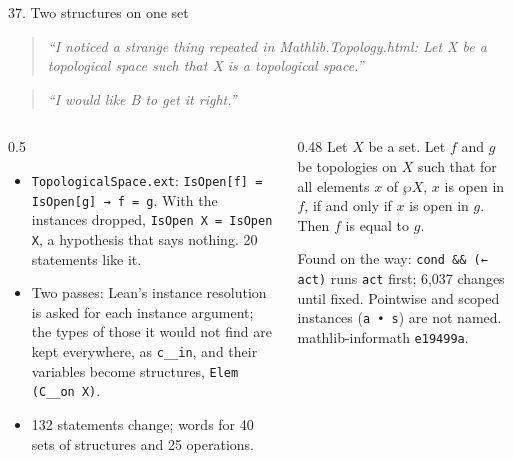 \documentclass[10pt,aspectratio=169]{beamer}
\newcommand{\bad}[1]{\textcolor{warn}{#1}}
\newcommand{\ok}[1]{\textcolor{good}{#1}}
\newcommand{\commit}[1]{\texttt{\footnotesize #1}}
\newcommand{\prompt}[1]{\begin{quote}\small\itshape ``#1''\end{quote}}
\begin{document}
\begin{frame}[fragile]{37. Two structures on one set}
  \footnotesize
  \prompt{I noticed a strange thing repeated in Mathlib.Topology.html: Let X be a topological
  space such that X is a topological space.}
  \prompt{I would like B to get it right.}
  \begin{columns}[T]
    \begin{column}{0.5\textwidth}
      \begin{itemize}
        \item \texttt{TopologicalSpace.ext}: \texttt{IsOpen[f] = IsOpen[g] → f = g}. With the
              instances dropped, \bad{\texttt{IsOpen X = IsOpen X}}, a hypothesis that says
              nothing. 20 statements like it.
        \item Two passes: Lean's instance resolution is asked for each instance argument; the
              types of those it would not find are kept everywhere, as \texttt{c\_\_in}, and
              their variables become structures, \texttt{Elem (C\_\_on X)}.
        \item 132 statements change; words for 40 sets of structures and 25 operations.
      \end{itemize}
    \end{column}
    \begin{column}{0.48\textwidth}
      \ok{Let $X$ be a set. Let $f$ and $g$ be topologies on $X$ such that for all elements $x$
      of $\wp X$, $x$ is open in $f$, if and only if $x$ is open in $g$. Then $f$ is equal to
      $g$.}

      \vspace{1mm}
      \scriptsize Found on the way: \texttt{cond \&\& (← act)} runs \texttt{act} first;
      \bad{6,037 changes} until fixed. Pointwise and scoped instances (\texttt{a • s}) are not
      named. mathlib-informath \commit{e19499a}.
    \end{column}
  \end{columns}
\end{frame}
\end{document}
